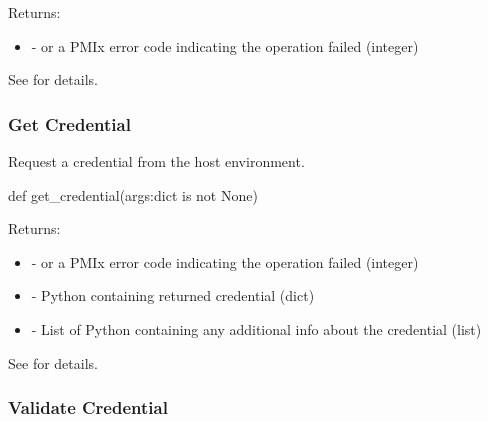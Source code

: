 Returns:
\begin{itemize}
    \item {} -  or a \ac{PMIx} error code indicating the operation failed (integer)
\end{itemize}

See  for details.


\subsubsection{Get Credential}

\summary

Request a credential from the host environment.

\format

\pyspecificstart
\begin{codepar}
def get_credential(args:dict is not None)
\end{codepar}
\pyspecificend

\begin{arglist}
\end{arglist}

Returns:
\begin{itemize}
    \item {} -  or a \ac{PMIx} error code indicating the operation failed (integer)
    \item {} - Python  containing returned credential (dict)
    \item {} - List of Python  containing any additional info about the credential (list)
\end{itemize}

See  for details.


\subsubsection{Validate Credential}


